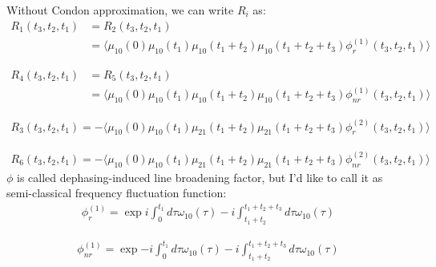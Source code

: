 \documentclass[12pt,a4paper,scale=1.0]{article}
\begin{document}
	  Without Condon approximation, we can write $R_i$ as:
	  \begin{equation}  
	  \begin{aligned}
	  R_1(t_3,t_2,t_1) & = R_2(t_3,t_2,t_1) \\
	  &= \langle \mu_{10}(0)\mu_{10}(t_1)\mu_{10}(t_1 +t_2 )\mu_{10}(t_1 +t_2 + t_3) \phi^{(1)}_{r}(t_3,t_2,t_1) \rangle
	  \end{aligned}
	  \end{equation}
	  
	  \begin{equation}  
	  \begin{aligned}
	  	R_4(t_3,t_2,t_1) & = R_5(t_3,t_2,t_1) \\
	  	&= \langle \mu_{10}(0)\mu_{10}(t_1)\mu_{10}(t_1 +t_2 )\mu_{10}(t_1 +t_2 + t_3) \phi^{(1)}_{nr}(t_3,t_2,t_1) \rangle
	  \end{aligned}
 	 \end{equation}
 	 
 	 \begin{equation}  
 	 \begin{aligned}
 	 R_3(t_3,t_2,t_1) = - \langle \mu_{10}(0)\mu_{10}(t_1)\mu_{21}(t_1 +t_2 )\mu_{21}(t_1 +t_2 + t_3) \phi^{(2)}_{r}(t_3,t_2,t_1) \rangle
 	 \end{aligned}
 	 \end{equation}
 	 
	  \begin{equation}  
	 \begin{aligned}
	 R_6(t_3,t_2,t_1) = - \langle \mu_{10}(0)\mu_{10}(t_1)\mu_{21}(t_1 +t_2 )\mu_{21}(t_1 +t_2 + t_3) \phi^{(2)}_{nr}(t_3,t_2,t_1) \rangle
	 \end{aligned}
	 \end{equation}
	 $\phi$ is called dephasing-induced line broadening factor\cite{doi:10.1063/1.1633549}, but I'd like to call it as  semi-classical frequency fluctuation function:
	  \begin{equation}  
	 \begin{aligned}
	  \phi^{(1)}_{r} = \exp{i\int_{0}^{t_1} d\tau \omega_{10}(\tau) - i\int_{t_1+t_2}^{t_1+t_2+t_3}d\tau \omega_{10}(\tau) }
	 \end{aligned}
	 \end{equation}
	 
	 \begin{equation}  
	 \begin{aligned}
	 \phi^{(1)}_{nr} = \exp{ - i \int_{0}^{t_1} d\tau \omega_{10}(\tau) - i\int_{t_1+t_2}^{t_1+t_2+t_3}d\tau \omega_{10}(\tau) }
	 \end{aligned}
	 \end{equation}
	 
\end{document}

